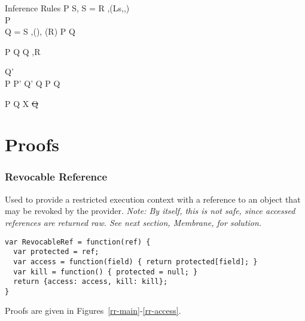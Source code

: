 \documentclass[a4paper,notitlepage]{report}
\begin{document}
\begin{display}{Inference Rules}
    {\tr P {} {S\sep\rv\doteq{}} \qquad
    S = R \sep \getValue(Ls,,)\\
      {} P\\
     Q = S \sep \isfalse()\sep\rv\doteq\und\qquad
     \rv\not\in \fv(R)}
    {\tr P {} Q}
  \vg

    {\tr P {} Q}
    { {} {Q \sep R}}

    { {} {Q'} \\
     P \impl P' \quad Q' \impl Q}
    {\tr P {} Q}
  \vg

    {\tr P {} Q}
    { {} {\exists X \st Q}}

    { \quad {}}
    {}

\end{display}

\chapter{Proofs}
\subsection{Revocable Reference}
Used to provide a restricted execution context with a reference to an object
that may be revoked by the provider.
\emph{Note: By itself, this is not safe, since accessed references are returned
  raw. See next section, Membrane, for solution.}

\begin{verbatim}
var RevocableRef = function(ref) {
  var protected = ref;
  var access = function(field) { return protected[field]; }
  var kill = function() { protected = null; }
  return {access: access, kill: kill};
}
\end{verbatim}

Proofs are given in Figures~\ref{rr-main}-\ref{rr-access}.
\end{document}
